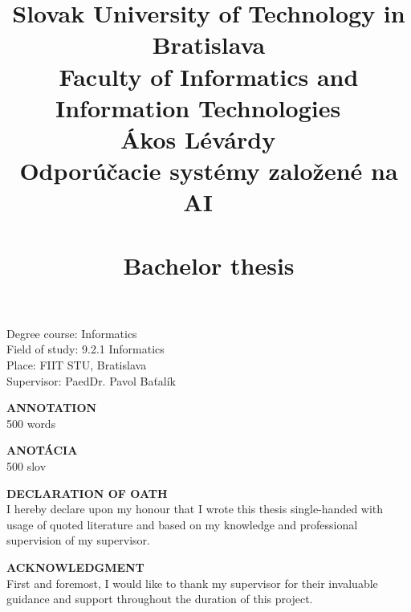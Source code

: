 \documentclass[10pt,oneside,english,a4paper]{article}
\title{\Large \textbf{Slovak University of Technology in Bratislava\\
Faculty of Informatics and Information Technologies} \ \\ \vspace{4\baselineskip} \Large{ Ákos
Lévárdy } \ \\ \LARGE{ Odporúčacie systémy založené na AI } \ \\ \ \\ \large{
Bachelor thesis} }
\begin{document}
 
\maketitle

\vspace{7\baselineskip} 		%
\hspace{-2cm} 				%
\parbox{0.8\textwidth}{ 
\raggedright 					%

\Large Degree course: Informatics\\ 
Field of study: 9.2.1 Informatics\\ 
Place: FIIT STU, Bratislava\\ 
Supervisor: PaedDr. Pavol Baťalík \\}




\newpage{} 
\hspace{-2cm} \Large \textbf{ANNOTATION}\\
500 words

\newpage{}
\hspace{-2cm} \Large \textbf{ANOTÁCIA}\\ 
500 slov 


\newpage{} 		%
\vspace*{\fill}
\noindent \Large \textbf{DECLARATION OF OATH}\\
\noindent I hereby declare upon my honour that I wrote this thesis single-handed with usage of quoted literature and based on my knowledge and professional supervision of my supervisor.
\vspace*{\fill} 
\vspace{-8cm} 



\newpage 		%
\vspace*{\fill} 
\noindent \Large \textbf{ ACKNOWLEDGMENT}\\
\noindent First and foremost, I would like to thank my supervisor for their invaluable guidance and support throughout the duration of this project.
\vspace*{\fill} 
\vspace{-8cm} 
\end{document}
